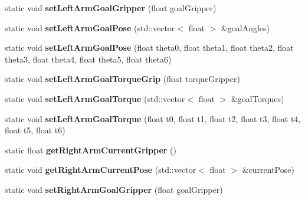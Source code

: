 \begin{DoxyCompactItemize}
\item 
static void {\bfseries set\+Left\+Arm\+Goal\+Gripper} (float goal\+Gripper)\hypertarget{class_justina_hardware_a302c5d44c07f89a64981ea66cef1bc2c}{}\label{class_justina_hardware_a302c5d44c07f89a64981ea66cef1bc2c}

\item 
static void {\bfseries set\+Left\+Arm\+Goal\+Pose} (std\+::vector$<$ float $>$ \&goal\+Angles)\hypertarget{class_justina_hardware_ae9fb4dd75a27cd198faae9b4b65164b2}{}\label{class_justina_hardware_ae9fb4dd75a27cd198faae9b4b65164b2}

\item 
static void {\bfseries set\+Left\+Arm\+Goal\+Pose} (float theta0, float theta1, float theta2, float theta3, float theta4, float theta5, float theta6)\hypertarget{class_justina_hardware_a6a183942ce5e538667c13c37bdc390e8}{}\label{class_justina_hardware_a6a183942ce5e538667c13c37bdc390e8}

\item 
static void {\bfseries set\+Left\+Arm\+Goal\+Torque\+Grip} (float torque\+Gripper)\hypertarget{class_justina_hardware_aeb1ca04d09c17d27d745e26f8dc7d7b4}{}\label{class_justina_hardware_aeb1ca04d09c17d27d745e26f8dc7d7b4}

\item 
static void {\bfseries set\+Left\+Arm\+Goal\+Torque} (std\+::vector$<$ float $>$ \&goal\+Torques)\hypertarget{class_justina_hardware_af9915dbb27ba996d712a58b91fe47942}{}\label{class_justina_hardware_af9915dbb27ba996d712a58b91fe47942}

\item 
static void {\bfseries set\+Left\+Arm\+Goal\+Torque} (float t0, float t1, float t2, float t3, float t4, float t5, float t6)\hypertarget{class_justina_hardware_a51cde8f106e007b2a6d1a3b72128b08d}{}\label{class_justina_hardware_a51cde8f106e007b2a6d1a3b72128b08d}

\item 
static float {\bfseries get\+Right\+Arm\+Current\+Gripper} ()\hypertarget{class_justina_hardware_a88d67531b114126292d419d9274d90a0}{}\label{class_justina_hardware_a88d67531b114126292d419d9274d90a0}

\item 
static void {\bfseries get\+Right\+Arm\+Current\+Pose} (std\+::vector$<$ float $>$ \&current\+Pose)\hypertarget{class_justina_hardware_a6bdeb7be02a29b2fcf4e930d381bffa7}{}\label{class_justina_hardware_a6bdeb7be02a29b2fcf4e930d381bffa7}

\item 
static void {\bfseries set\+Right\+Arm\+Goal\+Gripper} (float goal\+Gripper)\hypertarget{class_justina_hardware_af2687aa0206bcd2d9929cf8930ddb7c0}{}\label{class_justina_hardware_af2687aa0206bcd2d9929cf8930ddb7c0}


\end{DoxyCompactItemize}

